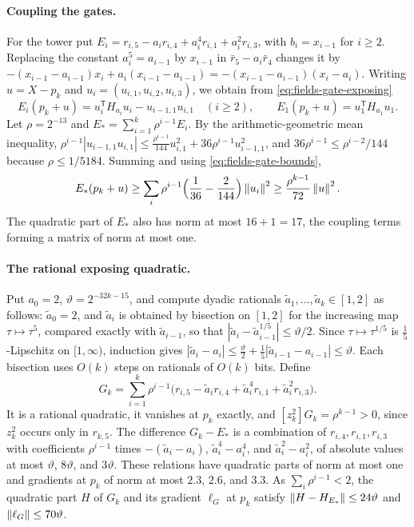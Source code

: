 \paragraph{Coupling the gates.}
For the tower put
$E_i=r_{i,5}-a_ir_{i,4}+a_i^4r_{i,1}+a_i^2r_{i,3}$, with $b_i=x_{i-1}$ for
$i\ge2$. Replacing the constant $a_i^5=a_{i-1}$ by $x_{i-1}$ in
$\bar r_5-a_i\bar r_4$ changes it by
$-(x_{i-1}-a_{i-1})x_i+a_i(x_{i-1}-a_{i-1})=-(x_{i-1}-a_{i-1})(x_i-a_i)$.
Writing $u=X-p_k$ and $u_i=(u_{i,1},u_{i,2},u_{i,3})$, we obtain from
\eqref{eq:fields-gate-exposing}
\[
 E_i(p_k+u)=u_i^{\mathsf T}H_{a_i}u_i-u_{i-1,1}u_{i,1}\quad(i\ge2),\qquad
 E_1(p_k+u)=u_1^{\mathsf T}H_{a_1}u_1 .
\]
Let $\rho=2^{-13}$ and $E_*=\sum_{i=1}^k\rho^{i-1}E_i$. By the
arithmetic-geometric mean inequality,
$\rho^{i-1}|u_{i-1,1}u_{i,1}|\le\frac{\rho^{i-1}}{144}u_{i,1}^2
+36\rho^{i-1}u_{i-1,1}^2$, and $36\rho^{i-1}\le\rho^{i-2}/144$ because
$\rho\le1/5184$. Summing and using \eqref{eq:fields-gate-bounds},
\[
 E_*(p_k+u)\ge\sum_i\rho^{i-1}\Bigl(\frac1{36}-\frac2{144}\Bigr)\left\lVert u_i\right\rVert^2
 \ge\frac{\rho^{k-1}}{72}\left\lVert u\right\rVert^2 .
\]
The quadratic part of $E_*$ also has norm at most $16+1=17$, the coupling
terms forming a matrix of norm at most one.

\paragraph{The rational exposing quadratic.}
Put $a_0=2$, $\vartheta=2^{-32k-15}$, and compute dyadic rationals
$\tilde a_1,\ldots,\tilde a_k\in[1,2]$ as follows: $\tilde a_0=2$, and
$\tilde a_i$ is obtained by bisection on $[1,2]$ for the increasing map
$\tau\mapsto\tau^5$, compared exactly with $\tilde a_{i-1}$, so that
$|\tilde a_i-\tilde a_{i-1}^{1/5}|\le\vartheta/2$. Since $\tau\mapsto\tau^{1/5}$ is
$\frac15$-Lipschitz on $[1,\infty)$, induction gives
$|\tilde a_i-a_i|\le\frac\vartheta2+\frac15|\tilde a_{i-1}-a_{i-1}|\le\vartheta$.
Each bisection uses $O(k)$ steps on rationals of $O(k)$ bits. Define
\[
 G_k=\sum_{i=1}^k\rho^{i-1}\bigl(r_{i,5}-\tilde a_ir_{i,4}
      +\tilde a_i^4r_{i,1}+\tilde a_i^2r_{i,3}\bigr).
\]
It is a rational quadratic, it vanishes at $p_k$ exactly, and
$[z_k^2]G_k=\rho^{k-1}>0$, since $z_k^2$ occurs only in $r_{k,5}$. The
difference $G_k-E_*$ is a combination of $r_{i,4},r_{i,1},r_{i,3}$ with
coefficients $\rho^{i-1}$ times $-(\tilde a_i-a_i)$,
$\tilde a_i^4-a_i^4$, and $\tilde a_i^2-a_i^2$, of absolute values at most
$\vartheta$, $8\vartheta$, and $3\vartheta$. These relations have quadratic parts of
norm at most one and gradients at $p_k$ of norm at most $2.3$, $2.6$, and
$3.3$. As $\sum_i\rho^{i-1}<2$, the quadratic part $H$ of $G_k$ and its
gradient $\ell_G$ at $p_k$ satisfy $\left\lVert H-H_{E_*}\right\rVert\le24\vartheta$ and
$\left\lVert\ell_G\right\rVert\le70\vartheta$.

